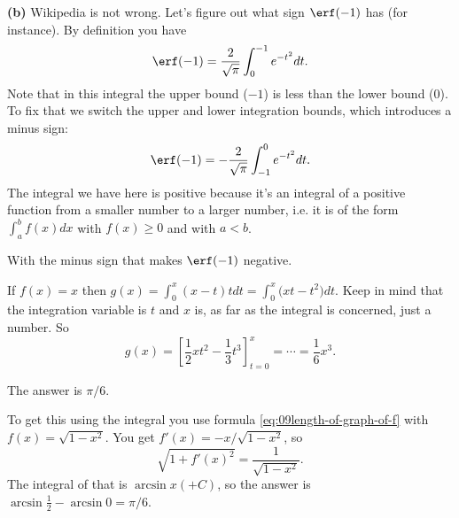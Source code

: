 \textbf{(b)} Wikipedia is not wrong. Let's figure out what sign
$\erf(-1)$ has (for instance).  By definition you have
\[
\erf(-1) =\frac{2}{\sqrt{\pi}} \int_0^{-1}e^{-t^2}dt.
\]
Note that in this integral the upper bound ($-1$) is less than the
lower bound ($0$).  To fix that we switch the upper and lower
integration bounds, which introduces a minus sign:
\[
\erf(-1) = -\frac{2}{\sqrt{\pi}}\int_{-1}^0 e^{-t^2} dt.
\]
The integral we have here is positive because it's an integral of a
positive function from a smaller number to a larger number, i.e. it
is of the form $\int_a^b f(x) dx$ with $f(x)\ge0$ and with $a<b$.

With the minus sign that makes $\erf(-1)$ negative.
\bigskip

\item[{\bfseries(VII10.10a)}]
If $f(x) = x$ then $g(x) = \int_0^x (x-t)tdt = \int_0^x \bigl(xt - t^2\bigr)
dt$.  Keep in mind that the integration variable is $t$ and $x$ is, as far as
the integral is concerned, just a number.  So
\[
  g(x) = \left[ \frac12xt^2 - \frac13 t^3 \right]_{t=0}^x = \cdots = \frac16x^3.
\]
\bigskip

\item[{\bfseries(VIII9.3)}]
The answer is $\pi/6$.

To get this using the integral you use formula
\eqref{eq:09length-of-graph-of-f} with $f(x) = \sqrt{1-x^2}$.
You get $f'(x) = -x/\sqrt{1-x^2}$, so
\[
\sqrt{1+f'(x)^2} = \frac{1}{\sqrt{1-x^2}}.
\]
The integral of that is $\arcsin x (+C)$, so the answer is
$\arcsin\tfrac12 - \arcsin 0 = \pi/6$.
\bigskip
